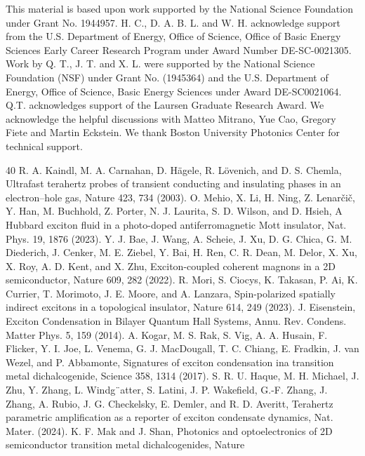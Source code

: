 \documentclass[
 reprint,
superscriptaddress,

 amsmath,amssymb,
 aps,

]{revtex4-2}
\begin{document}
This material is based upon work supported by the National Science Foundation under Grant No. 1944957. H. C., D. A. B. L. and W. H. acknowledge support from the U.S. Department of Energy, Office of Science, Office of Basic Energy Sciences Early Career Research Program under Award Number DE-SC-0021305. Work by Q. T., J. T. and X. L. were supported by the National Science Foundation (NSF) under Grant No. (1945364) and the U.S. Department of Energy, Office of Science, Basic Energy Sciences under Award DE-SC0021064. Q.T. acknowledges support of the Laursen Graduate Research Award. We acknowledge the helpful discussions with Matteo Mitrano, Yue Cao, Gregory Fiete and Martin Eckstein. We thank Boston University Photonics Center for technical support.

\begin{thebibliography}{40}
R. A. Kaindl, M. A. Carnahan, D. H\"{a}gele, R. L\"{o}venich,
and D. S. Chemla, Ultrafast terahertz probes of transient
conducting and insulating phases in an electron–hole gas,
Nature 423, 734 (2003).
O. Mehio, X. Li, H. Ning, Z. Lenar\v{c}i\v{c}, Y. Han, M. Buchhold,
Z. Porter, N. J. Laurita, S. D. Wilson, and D. Hsieh,
A Hubbard exciton fluid in a photo-doped antiferromagnetic
Mott insulator, Nat. Phys. 19, 1876 (2023).
Y. J. Bae, J. Wang, A. Scheie, J. Xu, D. G. Chica, G. M.
Diederich, J. Cenker, M. E. Ziebel, Y. Bai, H. Ren, C. R.
Dean, M. Delor, X. Xu, X. Roy, A. D. Kent, and X. Zhu,
Exciton-coupled coherent magnons in a 2D semiconductor,
Nature 609, 282 (2022).
R. Mori, S. Ciocys, K. Takasan, P. Ai, K. Currier, T. Morimoto,
J. E. Moore, and A. Lanzara, Spin-polarized spatially
indirect excitons in a topological insulator, Nature
614, 249 (2023).
J. Eisenstein, Exciton Condensation in Bilayer Quantum
Hall Systems, Annu. Rev. Condens. Matter Phys. 5, 159
(2014).
A. Kogar, M. S. Rak, S. Vig, A. A. Husain, F. Flicker,
Y. I. Joe, L. Venema, G. J. MacDougall, T. C. Chiang,
E. Fradkin, J. van Wezel, and P. Abbamonte, Signatures
of exciton condensation ina transition metal dichalcogenide,
Science 358, 1314 (2017).
S. R. U. Haque, M. H. Michael, J. Zhu, Y. Zhang,
L. Windg¨atter, S. Latini, J. P. Wakefield, G.-F. Zhang,
J. Zhang, A. Rubio, J. G. Checkelsky, E. Demler, and
R. D. Averitt, Terahertz parametric amplification as a
reporter of exciton condensate dynamics, Nat. Mater.
(2024).
K. F. Mak and J. Shan, Photonics and optoelectronics of
2D semiconductor transition metal dichalcogenides, Nature

\end{thebibliography}
\end{document}
